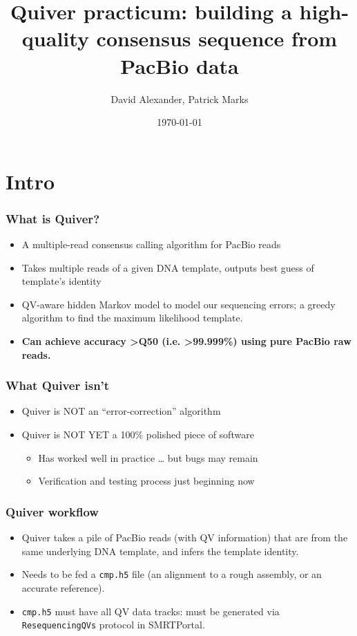 \documentclass[11pt,serif]{beamer}
\title{Quiver practicum: building a high-quality consensus sequence from PacBio data}
\author{David Alexander, Patrick Marks}
\date{\today}
\begin{document}
\maketitle


\section{Intro}
\label{sec-1}
\begin{frame}[fragile]\frametitle{What is Quiver?}
\label{sec-1-1}

\begin{itemize}
\item A multiple-read consensus calling algorithm for PacBio reads
\item Takes multiple reads of a given DNA template, outputs best guess
     of template's identity
\item QV-aware hidden Markov model to model our sequencing errors; a greedy
     algorithm to find the maximum likelihood template.
\item \textbf{Can achieve accuracy >Q50 (i.e. >99.999\%) using pure      PacBio raw reads.}
\end{itemize}
\end{frame}
\begin{frame}[fragile]\frametitle{What Quiver isn't}
\label{sec-1-2}

\begin{itemize}
\item Quiver is NOT an ``error-correction'' algorithm
\item Quiver is NOT YET a 100\% polished piece of software
\begin{itemize}
\item Has worked well in practice \ldots{} but bugs may remain
\item Verification and testing process just beginning now
\end{itemize}
\end{itemize}
\end{frame}
\begin{frame}[fragile]\frametitle{Quiver workflow}
\label{sec-1-3}

\begin{itemize}
\item Quiver takes a pile of PacBio reads (with QV information) that are
    from the same underlying DNA template, and infers the template identity.
\item Needs to be fed a \verb~cmp.h5~ file (an alignment to a rough assembly,
    or an accurate reference).
\item \verb~cmp.h5~ must have all QV data tracks: must be generated via
    \verb~ResequencingQVs~ protocol in SMRTPortal.
\end{itemize}
\end{frame}
\end{document}
